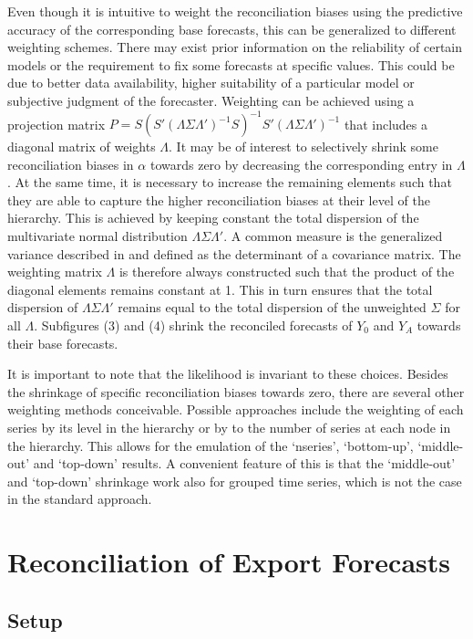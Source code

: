 \documentclass[a4paper,fleqn,11pt]{article}
\begin{document}
Even though it is intuitive to weight the reconciliation biases using the predictive accuracy of the corresponding base forecasts, this can be generalized to different weighting schemes. There may exist prior information on the reliability of certain models or the requirement to fix some forecasts at specific values. This could be due to better data availability, higher suitability of a particular model or subjective judgment of the forecaster. Weighting can be achieved using a projection matrix $P= S(S'(\Lambda\Sigma\Lambda')^{-1}S)^{-1}S'(\Lambda\Sigma\Lambda')^{-1}$ that includes a diagonal matrix of weights $\Lambda$. It may be of interest to selectively shrink some reconciliation biases in $\alpha$ towards zero by decreasing the corresponding entry in $\Lambda$. At the same time, it is necessary to increase the remaining elements such that they are able to capture the higher reconciliation biases at their level of the hierarchy. This is achieved by keeping constant the total dispersion of the multivariate normal distribution $\Lambda\Sigma\Lambda'$. A common measure is the generalized variance described in \cite{Mustonen1997} and defined as the determinant of a covariance matrix. The weighting matrix $\Lambda$ is therefore always constructed such that the product of the diagonal elements remains constant at 1. This in turn ensures that the total dispersion of $\Lambda\Sigma\Lambda'$ remains equal to the total dispersion of the unweighted $\Sigma$ for all $\Lambda$. Subfigures (3) and (4) shrink the reconciled forecasts of $Y_0$ and $Y_A$ towards their base forecasts.

It is important to note that the likelihood is invariant to these choices. Besides the shrinkage of specific reconciliation biases towards zero, there are several other weighting methods conceivable. Possible approaches include the weighting of each series by its level in the hierarchy or by to the number of series at each node in the hierarchy. This allows for the emulation of the `nseries', `bottom-up', `middle-out' and `top-down' results. A convenient feature of this is that the `middle-out' and `top-down' shrinkage work also for grouped time series, which is not the case in the standard approach.

\section{Reconciliation of Export Forecasts}\label{sec:appl}

\subsection{Setup}
\end{document}
